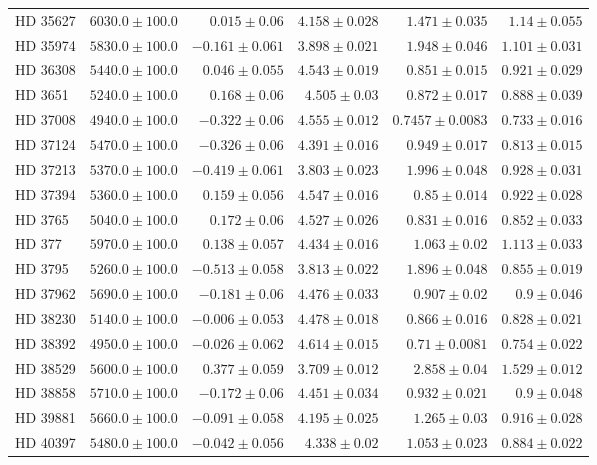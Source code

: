 \begin{longtable*}{lrrrrr}
HD 35627 & $6030.0\pm 100.0$ & $0.015\pm 0.06$ & $4.158\pm 0.028$ & $1.471\pm 0.035$ & $1.14\pm 0.055$ \\ 
HD 35974 & $5830.0\pm 100.0$ & $-0.161\pm 0.061$ & $3.898\pm 0.021$ & $1.948\pm 0.046$ & $1.101\pm 0.031$ \\ 
HD 36308 & $5440.0\pm 100.0$ & $0.046\pm 0.055$ & $4.543\pm 0.019$ & $0.851\pm 0.015$ & $0.921\pm 0.029$ \\ 
HD 3651 & $5240.0\pm 100.0$ & $0.168\pm 0.06$ & $4.505\pm 0.03$ & $0.872\pm 0.017$ & $0.888\pm 0.039$ \\ 
HD 37008 & $4940.0\pm 100.0$ & $-0.322\pm 0.06$ & $4.555\pm 0.012$ & $0.7457\pm 0.0083$ & $0.733\pm 0.016$ \\ 
HD 37124 & $5470.0\pm 100.0$ & $-0.326\pm 0.06$ & $4.391\pm 0.016$ & $0.949\pm 0.017$ & $0.813\pm 0.015$ \\ 
HD 37213 & $5370.0\pm 100.0$ & $-0.419\pm 0.061$ & $3.803\pm 0.023$ & $1.996\pm 0.048$ & $0.928\pm 0.031$ \\ 
HD 37394 & $5360.0\pm 100.0$ & $0.159\pm 0.056$ & $4.547\pm 0.016$ & $0.85\pm 0.014$ & $0.922\pm 0.028$ \\ 
HD 3765 & $5040.0\pm 100.0$ & $0.172\pm 0.06$ & $4.527\pm 0.026$ & $0.831\pm 0.016$ & $0.852\pm 0.033$ \\ 
HD 377 & $5970.0\pm 100.0$ & $0.138\pm 0.057$ & $4.434\pm 0.016$ & $1.063\pm 0.02$ & $1.113\pm 0.033$ \\ 
HD 3795 & $5260.0\pm 100.0$ & $-0.513\pm 0.058$ & $3.813\pm 0.022$ & $1.896\pm 0.048$ & $0.855\pm 0.019$ \\ 
HD 37962 & $5690.0\pm 100.0$ & $-0.181\pm 0.06$ & $4.476\pm 0.033$ & $0.907\pm 0.02$ & $0.9\pm 0.046$ \\ 
HD 38230 & $5140.0\pm 100.0$ & $-0.006\pm 0.053$ & $4.478\pm 0.018$ & $0.866\pm 0.016$ & $0.828\pm 0.021$ \\ 
HD 38392 & $4950.0\pm 100.0$ & $-0.026\pm 0.062$ & $4.614\pm 0.015$ & $0.71\pm 0.0081$ & $0.754\pm 0.022$ \\ 
HD 38529 & $5600.0\pm 100.0$ & $0.377\pm 0.059$ & $3.709\pm 0.012$ & $2.858\pm 0.04$ & $1.529\pm 0.012$ \\ 
HD 38858 & $5710.0\pm 100.0$ & $-0.172\pm 0.06$ & $4.451\pm 0.034$ & $0.932\pm 0.021$ & $0.9\pm 0.048$ \\ 
HD 39881 & $5660.0\pm 100.0$ & $-0.091\pm 0.058$ & $4.195\pm 0.025$ & $1.265\pm 0.03$ & $0.916\pm 0.028$ \\ 
HD 40397 & $5480.0\pm 100.0$ & $-0.042\pm 0.056$ & $4.338\pm 0.02$ & $1.053\pm 0.023$ & $0.884\pm 0.022$ \\ 

\end{longtable*}
